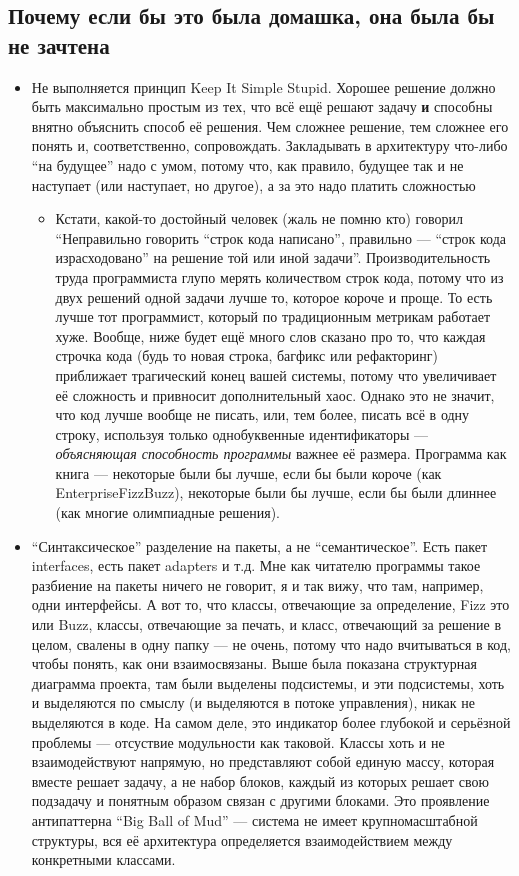 \documentclass[a5paper]{article}
\begin{document}
\subsection{Почему если бы это была домашка, она была бы не зачтена}

\begin{itemize}
	\item Не выполняется принцип Keep It Simple Stupid. Хорошее решение должно быть максимально простым из тех, что всё ещё решают задачу \textbf{и} способны внятно объяснить способ её решения. Чем сложнее решение, тем сложнее его понять и, соответственно, сопровождать. Закладывать в архитектуру что-либо ``на будущее'' надо с умом, потому что, как правило, будущее так и не наступает (или наступает, но другое), а за это надо платить сложностью
	\begin{itemize}
		\item Кстати, какой-то достойный человек (жаль не помню кто) говорил ``Неправильно говорить ``строк кода написано'', правильно --- ``строк кода израсходовано'' на решение той или иной задачи''. Производительность труда программиста глупо мерять количеством строк кода, потому что из двух решений одной задачи лучше то, которое короче и проще. То есть лучше тот программист, который по традиционным метрикам работает хуже. Вообще, ниже будет ещё много слов сказано про то, что каждая строчка кода (будь то новая строка, багфикс или рефакторинг) приближает трагический конец вашей системы, потому что увеличивает её сложность и привносит дополнительный хаос. Однако это не значит, что код лучше вообще не писать, или, тем более, писать всё в одну строку, используя только однобуквенные идентификаторы --- \textit{объясняющая способность программы} важнее её размера. Программа как книга --- некоторые были бы лучше, если бы были короче (как EnterpriseFizzBuzz), некоторые были бы лучше, если бы были длиннее (как многие олимпиадные решения).
	\end{itemize}
	\item ``Синтаксическое'' разделение на пакеты, а не ``семантическое''. Есть пакет interfaces, есть пакет adapters и т.д. Мне как читателю программы такое разбиение на пакеты ничего не говорит, я и так вижу, что там, например, одни интерфейсы. А вот то, что классы, отвечающие за определение, Fizz это или Buzz, классы, отвечающие за печать, и класс, отвечающий за решение в целом, свалены в одну папку --- не очень, потому что надо вчитываться в код, чтобы понять, как они взаимосвязаны. Выше была показана структурная диаграмма проекта, там были выделены подсистемы, и эти подсистемы, хоть и выделяются по смыслу (и выделяются в потоке управления), никак не выделяются в коде. На самом деле, это индикатор более глубокой и серьёзной проблемы --- отсуствие модульности как таковой. Классы хоть и не взаимодействуют напрямую, но представляют собой единую массу, которая вместе решает задачу, а не набор блоков, каждый из которых решает свою подзадачу и понятным образом связан с другими блоками. Это проявление антипаттерна ``Big Ball of Mud'' --- система не имеет крупномасштабной структуры, вся её архитектура определяется взаимодействием между конкретными классами.

\end{itemize}
\end{document}
